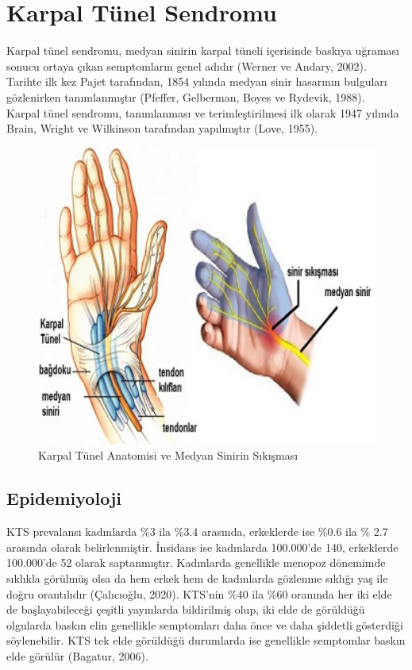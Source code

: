 \documentclass[12pt,twoside]{deuthesis}
\begin{document}
\hypertarget{KTSTanim}{%
\chapter{Karpal Tünel Sendromu}\label{KTSTanim}}

Karpal tünel sendromu, medyan sinirin karpal tüneli içerisinde baskıya uğraması sonucu ortaya çıkan semptomların genel adıdır (Werner ve Andary, 2002).\\
Tarihte ilk kez Pajet tarafından, 1854 yılında medyan sinir hasarının bulguları gözlenirken tanımlanmıştır (Pfeffer, Gelberman, Boyes ve Rydevik, 1988).\\
Karpal tünel sendromu, tanımlanması ve terimleştirilmesi ilk olarak 1947 yılında Brain, Wright ve Wilkinson tarafından yapılmıştır (Love, 1955).
\begin{figure}

{\centering \includegraphics[width=4.72in]{figure/karpal_tunnel} 

}

\caption{Karpal Tünel Anatomisi ve Medyan Sinirin Sıkışması}\label{fig:unnamed-chunk-1}
\end{figure}
\hypertarget{KTSEpidemiyoloji}{%
\section{Epidemiyoloji}\label{KTSEpidemiyoloji}}

KTS prevalansı kadınlarda \%3 ila \%3.4 arasında, erkeklerde ise \%0.6 ila \% 2.7 arasında olarak
belirlenmiştir. İnsidans ise kadınlarda 100.000'de 140, erkeklerde 100.000'de 52 olarak saptanmıştır.
Kadınlarda genellikle menopoz dönemimde sıklıkla görülmüş olsa da hem erkek hem de kadınlarda
gözlenme sıklığı yaş ile doğru orantılıdır (Çalıcıoğlu, 2020). KTS'nin \%40 ila \%60 oranında her iki elde de başlayabileceği çeşitli yayınlarda bildirilmiş olup, iki elde de görüldüğü olgularda baskın elin genellikle semptomları daha önce ve daha şiddetli gösterdiği söylenebilir. KTS tek elde görüldüğü durumlarda ise genellikle semptomlar baskın elde görülür (Bagatur, 2006).
\end{document}
